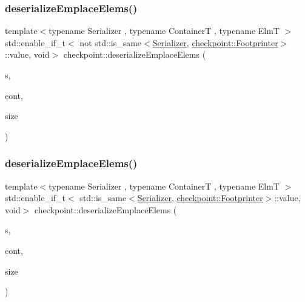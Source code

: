 \subsubsection{\texorpdfstring{deserialize\+Emplace\+Elems()}{deserializeEmplaceElems()}\hspace{0.1cm}{\footnotesize\ttfamily [1/2]}}
{\footnotesize\ttfamily template$<$typename Serializer , typename ContainerT , typename ElmT $>$ \\
std\+::enable\+\_\+if\+\_\+t$<$ not std\+::is\+\_\+same$<$\hyperlink{structcheckpoint_1_1_serializer}{Serializer}, \hyperlink{structcheckpoint_1_1_footprinter}{checkpoint\+::\+Footprinter}$>$\+::value, void$>$ checkpoint\+::deserialize\+Emplace\+Elems (\begin{DoxyParamCaption}\item[{\hyperlink{structcheckpoint_1_1_serializer}{Serializer} \&}]{s,  }\item[{ContainerT \&}]{cont,  }\item[{typename Container\+T\+::size\+\_\+type}]{size }\end{DoxyParamCaption})\hspace{0.3cm}{\ttfamily [inline]}}

\mbox{\label{namespacecheckpoint_a811956d461a3ebc7329272fd33e1084f}} 
\subsubsection{\texorpdfstring{deserialize\+Emplace\+Elems()}{deserializeEmplaceElems()}\hspace{0.1cm}{\footnotesize\ttfamily [2/2]}}
{\footnotesize\ttfamily template$<$typename Serializer , typename ContainerT , typename ElmT $>$ \\
std\+::enable\+\_\+if\+\_\+t$<$ std\+::is\+\_\+same$<$\hyperlink{structcheckpoint_1_1_serializer}{Serializer}, \hyperlink{structcheckpoint_1_1_footprinter}{checkpoint\+::\+Footprinter}$>$\+::value, void$>$ checkpoint\+::deserialize\+Emplace\+Elems (\begin{DoxyParamCaption}\item[{\hyperlink{structcheckpoint_1_1_serializer}{Serializer} \&}]{s,  }\item[{ContainerT \&}]{cont,  }\item[{typename Container\+T\+::size\+\_\+type}]{size }\end{DoxyParamCaption})\hspace{0.3cm}{\ttfamily [inline]}}

